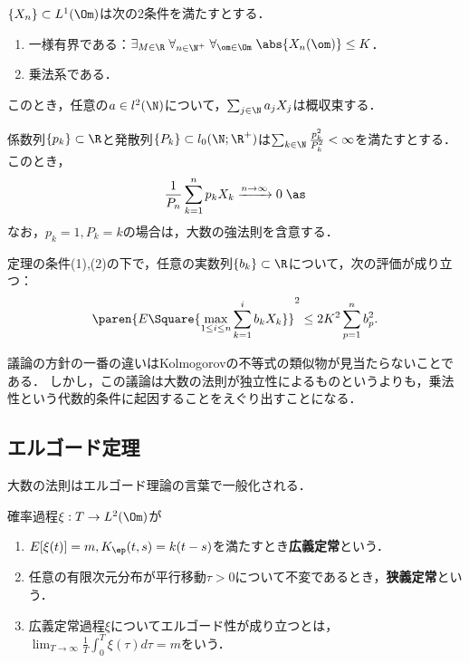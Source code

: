 \documentclass[uplatex,dvipdfmx]{jsreport}
\begin{document}
\begin{theorem}
    $\{X_n\}\subset L^1(\Om)$は次の2条件を満たすとする．
    \begin{enumerate}
        \item 一様有界である：$\exists_{M\in\R}\;\forall_{n\in\N^+}\;\forall_{\om\in\Om}\;\abs{X_n(\om)}\le K$．
        \item 乗法系である．
    \end{enumerate}
    このとき，任意の$a\in l^2(\N)$について，$\sum_{j\in\N}a_jX_j$は概収束する．
\end{theorem}
\begin{corollary}
    係数列$\{p_k\}\subset\R$と発散列$\{P_k\}\subset l_0(\N;\R^+)$は$\sum_{k\in\N}\frac{p_k^2}{P^2_k}<\infty$を満たすとする．このとき，
    \[\frac{1}{P_n}\sum_{k=1}^np_kX_k\xrightarrow{n\to\infty}0\;\as\]
    なお，$p_k=1,P_k=k$の場合は，大数の強法則を含意する．
\end{corollary}

\begin{lemma}[乗法系の最大不等式]
    定理の条件(1),(2)の下で，任意の実数列$\{b_k\}\subset\R$について，次の評価が成り立つ：
    \[\paren{E\Square{\max_{1\le i\le n}\sum_{k=1}^ib_kX_k}}^2\le 2K^2\sum_{p=1}^nb_p^2.\]
\end{lemma}
\begin{remarks}[最大不等式]
    議論の方針の一番の違いはKolmogorovの不等式の類似物が見当たらないことである．
    しかし，この議論は大数の法則が独立性によるものというよりも，乗法性という代数的条件に起因することをえぐり出すことになる．
\end{remarks}

\subsection{エルゴード定理}

\begin{tcolorbox}[colframe=ForestGreen, colback=ForestGreen!10!white,breakable,colbacktitle=ForestGreen!40!white,coltitle=black,fonttitle=\bfseries\sffamily,
title=]
    大数の法則はエルゴード理論の言葉で一般化される．

\end{tcolorbox}

\begin{definition}
    確率過程$\xi:T\to L^2(\Om)$が
    \begin{enumerate}
        \item $E[\xi(t)]=m,K_\ep(t,s)=k(t-s)$を満たすとき\textbf{広義定常}という．
        \item 任意の有限次元分布が平行移動$\tau>0$について不変であるとき，\textbf{狭義定常}という．
        \item 広義定常過程$\xi$についてエルゴード性が成り立つとは，$\lim_{T\to\infty}\frac{1}{T}\int^T_0\xi(\tau)d\tau=m$をいう．
    \end{enumerate}
\end{definition}
\end{document}
